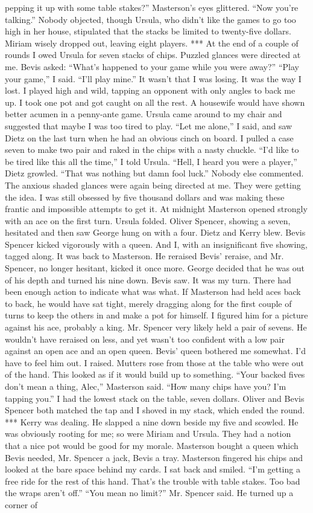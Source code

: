 \documentclass{novel}
\begin{document}
pepping it up with some table stakes?” Masterson’s eyes glittered. “Now you’re talking.” Nobody objected, though Ursula, who didn’t like the games to go too high in her house, stipulated that the stacks be limited to twenty-five dollars. Miriam wisely dropped out, leaving eight players. *** At the end of a couple of rounds I owed Ursula for seven stacks of chips. Puzzled glances were directed at me. Bevis asked: “What’s happened to your game while you were away?” “Play your game,” I said. “I’ll play mine.” It wasn’t that I was losing. It was the way I lost. I played high and wild, tapping an opponent with only angles to back me up. I took one pot and got caught on all the rest. A housewife would have shown better acumen in a penny-ante game. Ursula came around to my chair and suggested that maybe I was too tired to play. “Let me alone,” I said, and saw Dietz on the last turn when he had an obvious cinch on board. I pulled a case seven to make two pair and raked in the chips with a nasty chuckle. “I’d like to be tired like this all the time,” I told Ursula. “Hell, I heard you were a player,” Dietz growled. “That was nothing but damn fool luck.” Nobody else commented. The anxious shaded glances were again being directed at me. They were getting the idea. I was still obsessed by five thousand dollars and was making these frantic and impossible attempts to get it. At midnight Masterson opened strongly with an ace on the first turn. Ursula folded. Oliver Spencer, showing a seven, hesitated and then saw George hung on with a four. Dietz and Kerry blew. Bevis Spencer kicked vigorously with a queen. And I, with an insignificant five showing, tagged along. It was back to Masterson. He reraised Bevis’ reraise, and Mr. Spencer, no longer hesitant, kicked it once more. George decided that he was out of his depth and turned his nine down. Bevis saw. It was my turn. There had been enough action to indicate what was what. If Masterson had held aces back to back, he would have sat tight, merely dragging along for the first couple of turns to keep the others in and make a pot for himself. I figured him for a picture against his ace, probably a king. Mr. Spencer very likely held a pair of sevens. He wouldn’t have reraised on less, and yet wasn’t too confident with a low pair against an open ace and an open queen. Bevis’ queen bothered me somewhat. I’d have to feel him out. I raised. Mutters rose from those at the table who were out of the hand. This looked as if it would build up to something. “Your backed fives don’t mean a thing, Alec,” Masterson said. “How many chips have you? I’m tapping you.” I had the lowest stack on the table, seven dollars. Oliver and Bevis Spencer both matched the tap and I shoved in my stack, which ended the round. *** Kerry was dealing. He slapped a nine down beside my five and scowled. He was obviously rooting for me; so were Miriam and Ursula. They had a notion that a nice pot would be good for my morale. Masterson bought a queen which Bevis needed, Mr. Spencer a jack, Bevis a tray. Masterson fingered his chips and looked at the bare space behind my cards. I sat back and smiled. “I’m getting a free ride for the rest of this hand. That’s the trouble with table stakes. Too bad the wraps aren’t off.” “You mean no limit?” Mr. Spencer said. He turned up a corner of 
\end{document}
